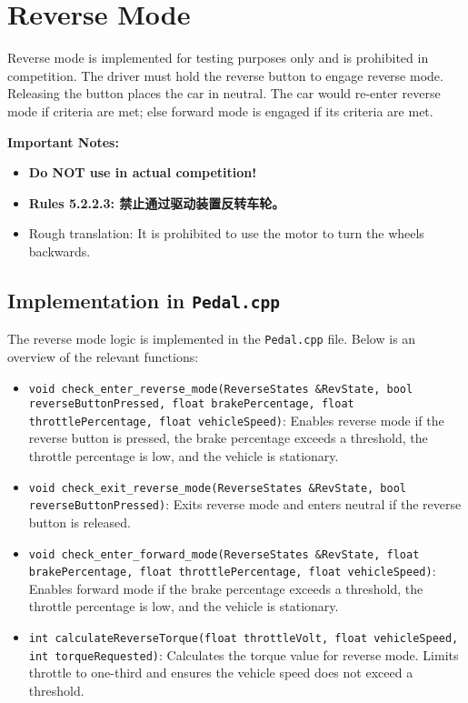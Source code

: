 \documentclass[a4paper,12pt]{article}
\begin{document}
\section{Reverse Mode}
Reverse mode is implemented for testing purposes only and is prohibited in competition. The driver must hold the reverse button to engage reverse mode. Releasing the button places the car in neutral. The car would re-enter reverse mode if criteria are met; else forward mode is engaged if its criteria are met.

\textbf{Important Notes:}
{
\begin{itemize}
    \item \textbf{Do NOT use in actual competition!}
    \item \textbf{Rules 5.2.2.3: 禁止通过驱动装置反转车轮。}
    \item Rough translation: It is prohibited to use the motor to turn the wheels backwards.
\end{itemize}
}

\subsection{Implementation in \texttt{Pedal.cpp}}
The reverse mode logic is implemented in the \texttt{Pedal.cpp} file. Below is an overview of the relevant functions:

\begin{itemize}
    \item \texttt{void check\_enter\_reverse\_mode(ReverseStates \&RevState, bool reverseButtonPressed, float brakePercentage, float throttlePercentage, float vehicleSpeed)}:
    Enables reverse mode if the reverse button is pressed, the brake percentage exceeds a threshold, the throttle percentage is low, and the vehicle is stationary.

    \item \texttt{void check\_exit\_reverse\_mode(ReverseStates \&RevState, bool reverseButtonPressed)}:
    Exits reverse mode and enters neutral if the reverse button is released.

    \item \texttt{void check\_enter\_forward\_mode(ReverseStates \&RevState, float brakePercentage, float throttlePercentage, float vehicleSpeed)}:
    Enables forward mode if the brake percentage exceeds a threshold, the throttle percentage is low, and the vehicle is stationary.

    \item \texttt{int calculateReverseTorque(float throttleVolt, float vehicleSpeed, int torqueRequested)}:
    Calculates the torque value for reverse mode. Limits throttle to one-third and ensures the vehicle speed does not exceed a threshold.
\end{itemize}
\end{document}

